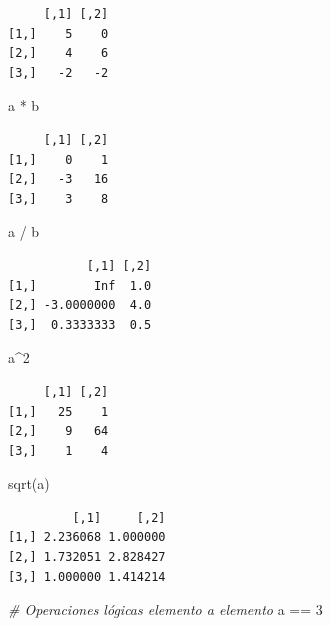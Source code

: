 \documentclass[
]{book}
\newenvironment{Shaded}{\begin{snugshade}}{\end{snugshade}}
\newcommand{\CommentTok}[1]{\textcolor[rgb]{0.56,0.35,0.01}{\textit{#1}}}
\newcommand{\DecValTok}[1]{\textcolor[rgb]{0.00,0.00,0.81}{#1}}
\newcommand{\FunctionTok}[1]{\textcolor[rgb]{0.00,0.00,0.00}{#1}}
\newcommand{\NormalTok}[1]{#1}
\newcommand{\SpecialCharTok}[1]{\textcolor[rgb]{0.00,0.00,0.00}{#1}}
\begin{document}
\begin{verbatim}
     [,1] [,2]
[1,]    5    0
[2,]    4    6
[3,]   -2   -2
\end{verbatim}

\begin{Shaded}
\begin{Highlighting}[]
\NormalTok{a }\SpecialCharTok{*}\NormalTok{ b}
\end{Highlighting}
\end{Shaded}

\begin{verbatim}
     [,1] [,2]
[1,]    0    1
[2,]   -3   16
[3,]    3    8
\end{verbatim}

\begin{Shaded}
\begin{Highlighting}[]
\NormalTok{a }\SpecialCharTok{/}\NormalTok{ b}
\end{Highlighting}
\end{Shaded}

\begin{verbatim}
           [,1] [,2]
[1,]        Inf  1.0
[2,] -3.0000000  4.0
[3,]  0.3333333  0.5
\end{verbatim}

\begin{Shaded}
\begin{Highlighting}[]
\NormalTok{a}\SpecialCharTok{\^{}}\DecValTok{2}
\end{Highlighting}
\end{Shaded}

\begin{verbatim}
     [,1] [,2]
[1,]   25    1
[2,]    9   64
[3,]    1    4
\end{verbatim}

\begin{Shaded}
\begin{Highlighting}[]
\FunctionTok{sqrt}\NormalTok{(a)}
\end{Highlighting}
\end{Shaded}

\begin{verbatim}
         [,1]     [,2]
[1,] 2.236068 1.000000
[2,] 1.732051 2.828427
[3,] 1.000000 1.414214
\end{verbatim}

\begin{Shaded}
\begin{Highlighting}[]
\CommentTok{\# Operaciones lógicas elemento a elemento}
\NormalTok{a }\SpecialCharTok{==} \DecValTok{3}
\end{Highlighting}
\end{Shaded}
\end{document}

